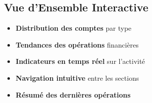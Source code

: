 \documentclass[10pt]{article}
\begin{document}
\subsection{Vue d'Ensemble Interactive}

\begin{minipage}{\textwidth}
    \begin{minipage}{0.35\textwidth}
        \begin{tcolorbox}[
            enhanced,
            colback=secondary!5,
            colframe=secondary,
            arc=5pt,
            title=Fonctionnalités clés,
            fonttitle=\small\bfseries\sffamily\color{white},
            coltitle=white,
            colbacktitle=secondary
        ]
            \begin{itemize}[leftmargin=15pt, itemsep=3pt, font=\small\sffamily]
                \item \textbf{Distribution des comptes} par type
                \item \textbf{Tendances des opérations} financières
                \item \textbf{Indicateurs en temps réel} sur l'activité
                \item \textbf{Navigation intuitive} entre les sections
                \item \textbf{Résumé des dernières opérations}
            \end{itemize}
        \end{tcolorbox}
        
        \vspace{0.5cm}
        

\end{minipage}
\end{minipage}
\end{document}
